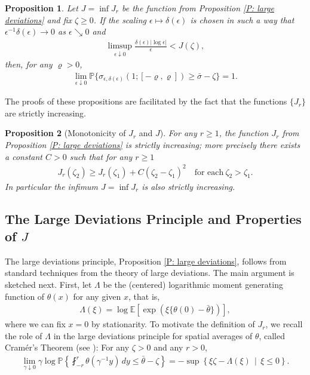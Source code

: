 \documentclass[10pt,a4paper]{amsart}
\newtheorem{prop}{Proposition}
\begin{document}
	\begin{prop} \label{P: upper deviations} Let $J = \inf J_{r}$ be the function from Proposition \ref{P: large deviations} and fix $\zeta \geq 0$.  If the scaling $\epsilon \mapsto \delta(\epsilon)$ is chosen in such a way that $\epsilon^{-1} \delta(\epsilon) \to 0$ as $\epsilon \searrow 0$ and
		\begin{align}\label{eqn:lb-helper-minus-two}
			\limsup_{ \epsilon \downarrow 0 } \frac{ \delta(\epsilon) | \log \epsilon | }{ \epsilon }  < J( \zeta ),
		\end{align}
	then, for any $\varrho > 0$,
		\begin{align*}
			\lim_{ \epsilon \downarrow 0 } \mathbb{P} \{ \sigma_{\epsilon,\delta(\epsilon)}(1; [ - \varrho , \varrho ] ) \geq \bar{\sigma} - \zeta \} = 1.
		\end{align*}
	\end{prop}

	The proofs of these propositions are facilitated by the fact that the functions $\{J_{r}\}$ are strictly increasing.

	\begin{prop}[Monotonicity of $ J_{ r } $ and $ J $] \label{cor:monotonicity-jr}
	For any $r \geq 1$, the function $ J_{ r } $ from Proposition \ref{P: large deviations} is strictly increasing; more precisely there exists a constant $ C > 0 $ such that for any $ r \geq 1 $
		\begin{align*}
			J_{ r } ( \zeta_{2} ) \geq J_{ r } ( \zeta_{1} ) + C ( \zeta_{2} - \zeta_{1} )^{2} \quad \text{for each} ~ \zeta_{2} > \zeta_{1} .
		\end{align*}
	In particular the infimum $ J = \inf J_{r} $ is also strictly increasing.
\end{prop}

\subsection{The Large Deviations Principle and Properties of $J$} \label{S: large deviations explained} The large deviations principle, Proposition \ref{P: large deviations}, follows from standard techniques from the theory of large deviations.  The main argument is sketched next.  First, let $\Lambda$ be the (centered) logarithmic moment generating function of $\theta(x)$ for any given $x$, that is,
	\begin{align} \label{E: moment generating function}
		\Lambda(\xi) = \log \mathbb{E} [ \exp ( \xi \{ \theta(0) - \bar{\theta} \} ) ],
	\end{align}
where we can fix $x = 0$ by stationarity. To motivate the definition of $J_{r}$, we recall the role of $\Lambda$ in the large deviations principle for spatial averages of $\theta$, called Cram\'{e}r's Theorem (see \cite{dembo_zeitouni,Rassoul-Agha,varadhan}): For any $\zeta > 0$ and any $r > 0$,
	\begin{align*}
		\lim_{ \gamma \downarrow 0 } \gamma \log \mathbb{P} \left\{ \fint_{-r}^{r} \theta( \gamma^{-1} y) \, dy \leq \bar{\theta} - \zeta \right\} = -\sup \left\{ \xi \zeta - \Lambda(\xi) \, \mid \, \xi \leq 0 \right\}.
	\end{align*}
\end{document}
